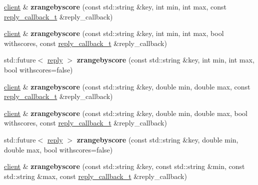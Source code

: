 \begin{DoxyCompactItemize}
\hyperlink{classcpp__redis_1_1client}{client} \& {\bfseries zrangebyscore} (const std\+::string \&key, int min, int max, const \hyperlink{classcpp__redis_1_1client_a061a1140d36d2eaeda82b09a0bb3f9f2}{reply\+\_\+callback\+\_\+t} \&reply\+\_\+callback)
\item 
\mbox{\label{classcpp__redis_1_1client_a91a1f7e33760150dc4ed4548cc17fe38}} 
\hyperlink{classcpp__redis_1_1client}{client} \& {\bfseries zrangebyscore} (const std\+::string \&key, int min, int max, bool withscores, const \hyperlink{classcpp__redis_1_1client_a061a1140d36d2eaeda82b09a0bb3f9f2}{reply\+\_\+callback\+\_\+t} \&reply\+\_\+callback)
\item 
\mbox{\label{classcpp__redis_1_1client_a026373604e64913039351ca838e0d71c}} 
std\+::future$<$ \hyperlink{classcpp__redis_1_1reply}{reply} $>$ {\bfseries zrangebyscore} (const std\+::string \&key, int min, int max, bool withscores=false)
\item 
\mbox{\label{classcpp__redis_1_1client_a7f0b361b7d775c353510dbbd2a213bc6}} 
\hyperlink{classcpp__redis_1_1client}{client} \& {\bfseries zrangebyscore} (const std\+::string \&key, double min, double max, const \hyperlink{classcpp__redis_1_1client_a061a1140d36d2eaeda82b09a0bb3f9f2}{reply\+\_\+callback\+\_\+t} \&reply\+\_\+callback)
\item 
\mbox{\label{classcpp__redis_1_1client_ab2912fb086099e6f6ecbeafcf87d6a04}} 
\hyperlink{classcpp__redis_1_1client}{client} \& {\bfseries zrangebyscore} (const std\+::string \&key, double min, double max, bool withscores, const \hyperlink{classcpp__redis_1_1client_a061a1140d36d2eaeda82b09a0bb3f9f2}{reply\+\_\+callback\+\_\+t} \&reply\+\_\+callback)
\item 
\mbox{\label{classcpp__redis_1_1client_ae5b8ba7726075313f9ae36776c7aad22}} 
std\+::future$<$ \hyperlink{classcpp__redis_1_1reply}{reply} $>$ {\bfseries zrangebyscore} (const std\+::string \&key, double min, double max, bool withscores=false)
\item 
\mbox{\label{classcpp__redis_1_1client_a9ec7979a49fb1602708b2f5e4e4b10c8}} 
\hyperlink{classcpp__redis_1_1client}{client} \& {\bfseries zrangebyscore} (const std\+::string \&key, const std\+::string \&min, const std\+::string \&max, const \hyperlink{classcpp__redis_1_1client_a061a1140d36d2eaeda82b09a0bb3f9f2}{reply\+\_\+callback\+\_\+t} \&reply\+\_\+callback)

\end{DoxyCompactItemize}
